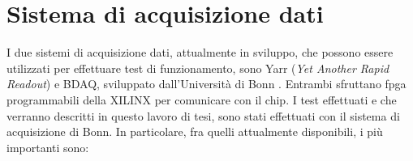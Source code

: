 
\section{Sistema di acquisizione dati}

I due sistemi di acquisizione dati, attualmente in sviluppo, che possono essere utilizzati per effettuare test di funzionamento, sono Yarr (\textit{Yet Another Rapid Readout}) \cite{YARR} e BDAQ, sviluppato dall'Università di Bonn \cite{BDAQ}. 
Entrambi sfruttano fpga programmabili della XILINX per comunicare con il chip. 
I test effettuati e che verranno descritti in questo lavoro di tesi, sono stati effettuati con il sistema di acquisizione di Bonn.
In particolare, fra quelli attualmente disponibili, i più importanti sono:

